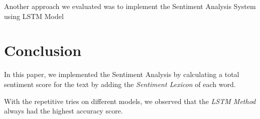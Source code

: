 \documentclass[11pt,a4paper]{article}
\begin{document}
Another approach we evaluated was to implement the Sentiment Analysis System using LSTM Model



\section{Conclusion}
In this paper, we implemented the Sentiment Analysis by calculating a total sentiment score for the text by adding the \textit{Sentiment Lexicon} of each word.

With the repetitive tries on different models, we observed that the \textit{LSTM Method} always had the highest accuracy score. 



\end{document}
